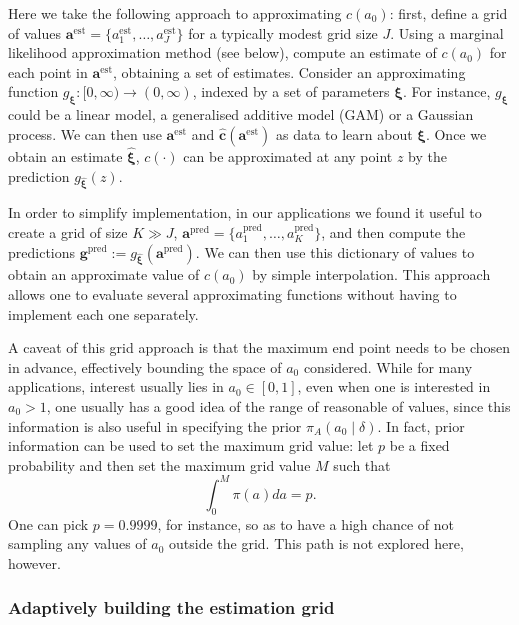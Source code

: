 \documentclass[a4paper, notitlepage, 11pt]{article}
\begin{document}
Here we take the following approach to approximating $c(a_0)$: first, define a grid of values $\boldsymbol a^{\text{est}} = \{ a^{\text{est}}_1, \ldots, a^{\text{est}}_J \}$ for a typically modest grid size $J$.
Using a marginal likelihood approximation method (see below), compute an estimate of $c(a_0)$ for each point in $\boldsymbol a^{\text{est}}$, obtaining a set of estimates.
Consider an approximating function $g_{\boldsymbol\xi} : [0, \infty) \to (0, \infty)$, indexed by a set of parameters $\boldsymbol\xi$.
For instance, $g_{\boldsymbol\xi}$ could be a linear model, a generalised additive model (GAM) or a Gaussian process.
We can then use  $\boldsymbol a^{\text{est}}$ and $\hat{\boldsymbol c}(\boldsymbol a^{\text{est}})$ as data to learn about $\boldsymbol\xi$.
Once we obtain an estimate  $\hat{\boldsymbol \xi}$, $c(\cdot)$ can be approximated at any point $z$ by the prediction $g_{\hat{\boldsymbol \xi}}(z)$.

In order to simplify implementation, in our applications we found it useful to create a grid of size $K \gg J$, $\boldsymbol a^{\text{pred}} = \{ a^{\text{pred}}_1, \ldots, a^{\text{pred}}_K \}$, and then compute the predictions $\boldsymbol g^{\text{pred}} := g_{\hat{\boldsymbol \xi}}( \boldsymbol a^{\text{pred}} )$.
We can then use this dictionary of values to obtain an approximate value of $c(a_0)$ by simple interpolation.
This approach allows one to evaluate several approximating functions without having to implement each one separately.

A caveat of this grid approach is that the maximum end point needs to be chosen in advance, effectively bounding the space of $a_0$ considered. 
While for many applications, interest usually lies in $a_0 \in [0, 1]$, even when one is interested in $a_0 > 1$, one usually has a good idea of the range of reasonable of values, since this information is also useful in specifying the prior $\pi_A(a_0\mid \delta)$.
In fact, prior information can be used to set the maximum grid value: let $p$ be a fixed probability and then set the maximum grid value $M$ such that
\[ \int_0^M \pi(a) da = p. \]
One can pick $p = 0.9999$, for instance, so as to have a high chance of not sampling any values of $a_0$ outside the grid.
This path is not explored here, however.

\subsubsection{Adaptively building the estimation grid}
\label{sec:adapt_grid}
\end{document}
